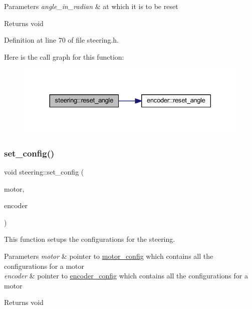 \begin{DoxyParams}{Parameters}
{\em angle\+\_\+in\+\_\+radian} & at which it is to be reset \\
\hline
\end{DoxyParams}
\begin{DoxyReturn}{Returns}
void 
\end{DoxyReturn}


Definition at line 70 of file steering.\+h.

Here is the call graph for this function\+:
\nopagebreak
\begin{figure}[H]
\begin{center}
\leavevmode
\includegraphics[width=330pt]{classsteering_ab0fb97c4af86a1d5ed668a58fba15ba3_cgraph}
\end{center}
\end{figure}
\mbox{\label{classsteering_a849eba14376618441a86e0ccdc1dc066}} 
\subsubsection{\texorpdfstring{set\_config()}{set\_config()}}
{\footnotesize\ttfamily void steering\+::set\+\_\+config (\begin{DoxyParamCaption}\item[{\mbox{\hyperlink{structmotor__config}{motor\+\_\+config}} $\ast$}]{motor,  }\item[{\mbox{\hyperlink{structencoder__config}{encoder\+\_\+config}} $\ast$}]{encoder }\end{DoxyParamCaption})\hspace{0.3cm}{\ttfamily [inline]}}



This function setups the configurations for the steering. 


\begin{DoxyParams}{Parameters}
{\em motor} & pointer to \mbox{\hyperlink{structmotor__config}{motor\+\_\+config}} which contains all the configurations for a motor \\
\hline
{\em encoder} & pointer to \mbox{\hyperlink{structencoder__config}{encoder\+\_\+config}} which contains all the configurations for a motor\\
\hline
\end{DoxyParams}
\begin{DoxyReturn}{Returns}
void 
\end{DoxyReturn}


